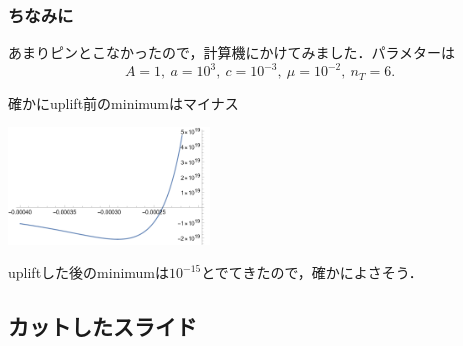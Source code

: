\documentclass[
  a4paper,uplatex,dvipdfmx,10pt,
  xcolor = {dvipsnames,svgnames},
  hyperref ={colorlinks=true,citecolor=Navy,linkcolor=NavyBlue,urlcolor=purple}
]{beamer}
\begin{document}
\begin{frame}[plain]
  \frametitle{ちなみに}

  あまりピンとこなかったので，計算機にかけてみました．パラメターは
  \begin{equation}
    A=1,\  a=10^{3},\  c=10^{-3},\  \mu=10^{-2},\ n_{T}=6.
    \nonumber
  \end{equation}

  \vspace{10pt}

  確かにuplift前のminimumはマイナス

  \begin{center}
    \includegraphics[width=0.4\textwidth]{fig/before_uplifting/before_uplifting.png}
  \end{center}

  \vspace{10pt}

  upliftした後のminimumは$10^{-15}$とでてきたので，確かによさそう．

\end{frame}

\subsection{カットしたスライド}
\end{document}
